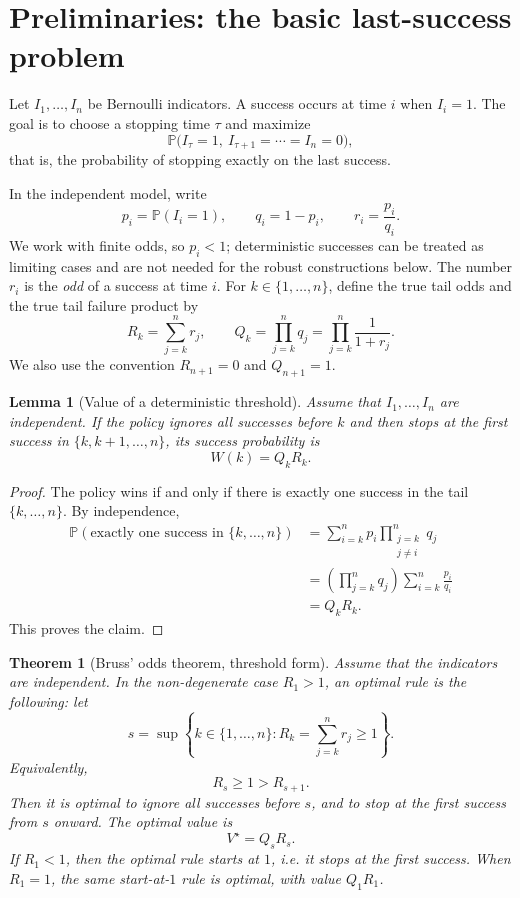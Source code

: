 \documentclass[11pt,a4paper]{article}
\newtheorem{theorem}{Theorem}
\newtheorem{lemma}{Lemma}
\begin{document}
\section{Preliminaries: the basic last-success problem}
\label{sec:basic}

Let \(I_1,\dots,I_n\) be Bernoulli indicators.  A success occurs at time \(i\)
when \(I_i=1\).  The goal is to choose a stopping time \(\tau\) and maximize
\[
  \mathbb P\bigl(I_\tau=1,\ I_{\tau+1}=\cdots=I_n=0\bigr),
\]
that is, the probability of stopping exactly on the last success.

In the independent model, write
\[
  p_i=\mathbb P(I_i=1),\qquad q_i=1-p_i,\qquad
  r_i=\frac{p_i}{q_i}.
\]
We work with finite odds, so \(p_i<1\); deterministic successes can be treated
as limiting cases and are not needed for the robust constructions below.  The
number \(r_i\) is the \emph{odd} of a success at time \(i\).  For
\(k\in\{1,\dots,n\}\), define the true tail odds and the true tail failure
product by
\[
  R_k=\sum_{j=k}^n r_j,\qquad
  Q_k=\prod_{j=k}^n q_j=\prod_{j=k}^n \frac1{1+r_j}.
\]
We also use the convention \(R_{n+1}=0\) and \(Q_{n+1}=1\).

\begin{lemma}[Value of a deterministic threshold]
\label{lem:threshold-value}
Assume that \(I_1,\dots,I_n\) are independent.  If the policy ignores all
successes before \(k\) and then stops at the first success in
\(\{k,k+1,\dots,n\}\), its success probability is
\[
  W(k)=Q_kR_k.
\]
\end{lemma}

\begin{proof}
The policy wins if and only if there is exactly one success in the tail
\(\{k,\dots,n\}\).  By independence,
\begin{align*}
  \mathbb P(\text{exactly one success in }\{k,\dots,n\})
  &=\sum_{i=k}^n p_i\prod_{\substack{j=k\\j\ne i}}^n q_j \\
  &=\left(\prod_{j=k}^n q_j\right)
    \sum_{i=k}^n \frac{p_i}{q_i} \\
  &=Q_kR_k.
\end{align*}
This proves the claim.
\end{proof}

\begin{theorem}[Bruss' odds theorem, threshold form]
\label{thm:bruss}
Assume that the indicators are independent.  In the non-degenerate case
\(R_1>1\), an optimal rule is the following: let
\[
  s=\sup\left\{k\in\{1,
  \dots,n\}:R_k=\sum_{j=k}^n r_j\ge1\right\}.
\]
Equivalently,
\[
  R_s\ge1>R_{s+1}.
\]
Then it is optimal to ignore all successes before \(s\), and to stop at the
first success from \(s\) onward.  The optimal value is
\[
  V^\star=Q_sR_s.
\]
If \(R_1<1\), then the optimal rule starts at \(1\), i.e. it stops at the first
success.
When \(R_1=1\), the same start-at-\(1\) rule is optimal, with value \(Q_1R_1\).
\end{theorem}
\end{document}
